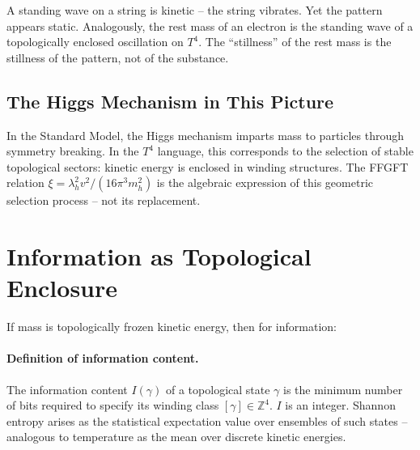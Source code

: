 A standing wave on a string is kinetic -- the string vibrates.
Yet the pattern appears static.
Analogously, the rest mass of an electron is the standing wave
of a topologically enclosed oscillation on \(T^4\).
The \enquote{stillness} of the rest mass is the stillness of the
pattern, not of the substance.

\subsection{The Higgs Mechanism in This Picture}

In the Standard Model, the Higgs mechanism imparts mass to particles
through symmetry breaking. In the \(T^4\) language, this corresponds
to the selection of stable topological sectors: kinetic energy is
enclosed in winding structures.
The FFGFT relation \(\xi = \lambda_h^2 v^2 / (16\pi^3 m_h^2)\)
is the algebraic expression of this geometric selection process --
not its replacement.

\section{Information as Topological Enclosure}

If mass is topologically frozen kinetic energy, then for information:

\begin{center}
\renewcommand{\arraystretch}{1.4}
\end{center}

\paragraph{Definition of information content.}
The information content \(I(\gamma)\) of a topological state \(\gamma\)
is the minimum number of bits required to specify its winding class
\([\gamma] \in \mathbb{Z}^4\).
\(I\) is an integer.
Shannon entropy arises as the statistical expectation value over
ensembles of such states -- analogous to temperature as the mean
over discrete kinetic energies.

